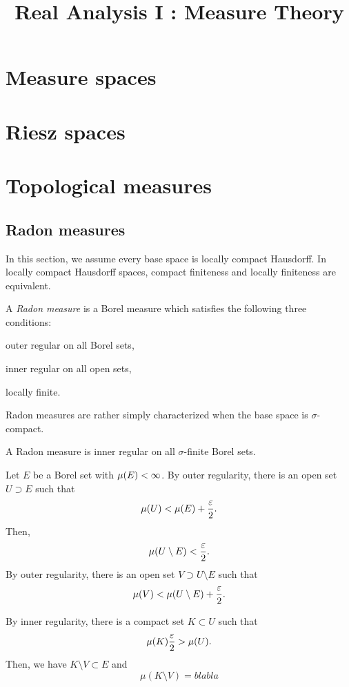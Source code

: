 \documentclass{../crs}
\title{Real Analysis I : Measure Theory}
\begin{document}
\maketitle
\tableofcontents

\chapter{Measure spaces}


\chapter{Riesz spaces}



\chapter{Topological measures}

\section{Radon measures}
In this section, we assume every base space is locally compact Hausdorff.
In locally compact Hausdorff spaces, compact finiteness and locally finiteness are equivalent.
\begin{defn}
A \emph{Radon measure} is a Borel measure which satisfies the following three conditions:
\begin{cond}
\item outer regular on all Borel sets,
\item inner regular on all open sets,
\item locally finite.
\end{cond}
\end{defn}

Radon measures are rather simply characterized when the base space is $\sigma$-compact.
\begin{thm}
A Radon measure is inner regular on all $\sigma$-finite Borel sets.
\end{thm}
\begin{pf}
Let $E$ be a Borel set with $\mu(E)<\infty$.
By outer regularity, there is an open set $U\supset E$ such that
\[\mu(U)<\mu(E)+\frac{\varepsilon}2.\]
Then,
\[\mu(U\setminus E)<\frac{\varepsilon}2.\]
By outer regularity, there is an open set $V\supset U\setminus E$ such that
\[\mu(V)<\mu(U\setminus E)+\frac{\varepsilon}2.\]

By inner regularity, there is a compact set $K\subset U$ such that
\[\mu(K)\frac{\varepsilon}2>\mu(U).\]
Then, we have $K\setminus V\subset E$ and
\[\mu(K\setminus V)=blabla\]
\end{pf}
\end{document}
